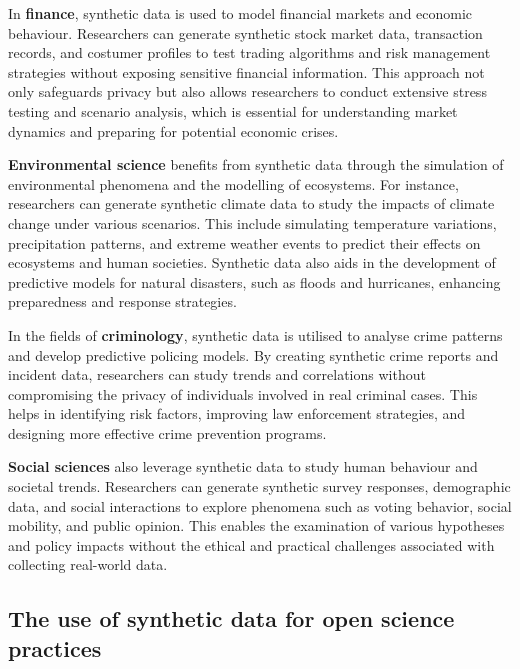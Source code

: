 In \textbf{finance}, synthetic data is used to model financial markets and economic behaviour. Researchers can generate synthetic stock market data, transaction records, and costumer profiles to test trading algorithms and risk management strategies without exposing sensitive financial information. This approach not only safeguards privacy but also allows researchers to conduct extensive stress testing and scenario analysis, which is essential for understanding market dynamics and preparing for potential economic crises. \cite{assefa2020generating,eckerli2021generative}

\textbf{Environmental science} benefits from synthetic data through the simulation of environmental phenomena and the modelling of ecosystems. For instance, researchers can generate synthetic climate data to study the impacts of climate change under various scenarios. This include simulating temperature variations, precipitation patterns, and extreme weather events to predict their effects on ecosystems and human societies. Synthetic data also aids in the development of predictive models for natural disasters, such as floods and hurricanes, enhancing preparedness and response strategies. \cite{kravitz2021potential,perez2021machine}

In the fields of \textbf{criminology}, synthetic data is utilised to analyse crime patterns and develop predictive policing models. By creating synthetic crime reports and incident data, researchers can study trends and correlations without compromising the privacy of individuals involved in real criminal cases. This helps in identifying risk factors, improving law enforcement strategies, and designing more effective crime prevention programs. \cite{brunton2024using}

\textbf{Social sciences} also leverage synthetic data to study human behaviour and societal trends. Researchers can generate synthetic survey responses, demographic data, and social interactions to explore phenomena such as voting behavior, social mobility, and public opinion. This enables the examination of various hypotheses and policy impacts without the ethical and practical challenges associated with collecting real-world data. \cite{hradec2022multipurpose,kokosi2022overview}

\newpage
\subsection{The use of synthetic data for open science practices}

